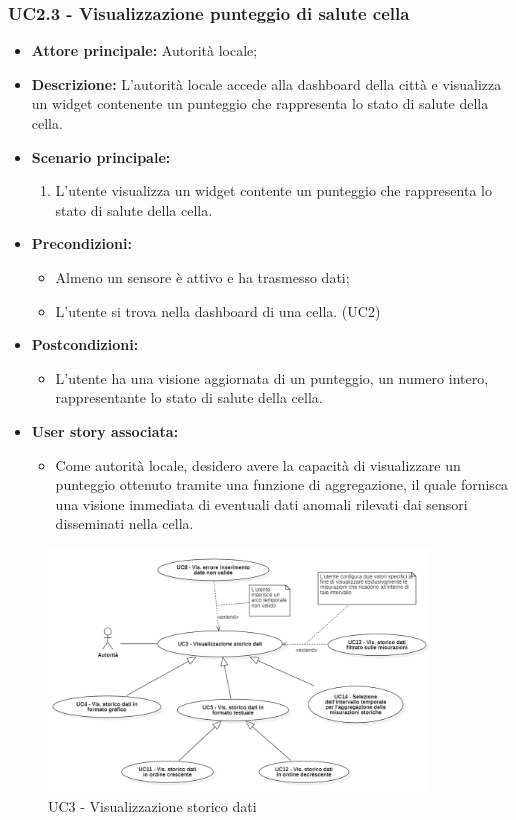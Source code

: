 \documentclass{article}
\begin{document}
\subsubsection{UC2.3 - Visualizzazione punteggio di salute cella}
\begin{itemize}
    \item \textbf{Attore principale:} Autorità locale;
    \item \textbf{Descrizione:} L'autorità locale accede alla dashboard della città e visualizza un widget contenente un punteggio che rappresenta lo stato di salute della cella.
    \item \textbf{Scenario principale:}
          \begin{enumerate}
              \item L'utente visualizza un widget contente un punteggio che rappresenta lo stato di salute della cella.
          \end{enumerate}
    \item \textbf{Precondizioni:}
          \begin{itemize}
              \item Almeno un sensore è attivo e ha trasmesso dati;
              \item L'utente si trova nella dashboard di una cella. (UC2)
          \end{itemize}
    \item \textbf{Postcondizioni:}
          \begin{itemize}
              \item      L'utente ha una visione aggiornata di un punteggio, un numero intero, rappresentante lo stato di salute della cella.
          \end{itemize}
    \item \textbf{User story associata:}
          \begin{itemize}
              \item Come autorità locale, desidero avere la capacità di visualizzare un punteggio ottenuto tramite una funzione di aggregazione, il quale fornisca una visione immediata di eventuali dati anomali rilevati dai sensori disseminati nella cella.
          \end{itemize}
\end{itemize}

\begin{figure}[H]
    \centering
    \includegraphics[width=0.9\textwidth]{Images/uc3.png}
    \caption{UC3 - Visualizzazione storico dati }
    \label{fig:UC3}
\end{figure}
\end{document}
